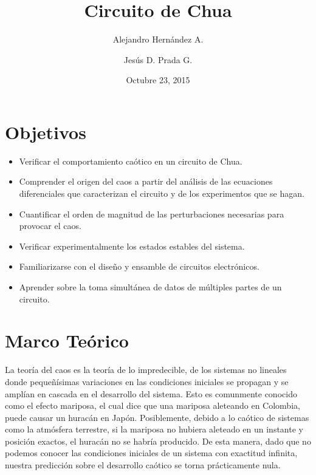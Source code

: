 \documentclass[%
 reprint,
%
 amsmath,amssymb,
 aps,
]{revtex4-1}
\begin{document}

\title{Circuito de Chua}%

\author{Alejandro Hernández A.}
 
\author{Jesús D. Prada G.}
 
%

\date{Octubre 23, 2015}%


\maketitle

\section{\label{sec:level1}Objetivos}
\begin{itemize}
\item Verificar el comportamiento caótico en un circuito de Chua.
\item Comprender el origen del caos a partir del análisis de las ecuaciones diferenciales que caracterizan el circuito y de los experimentos que se hagan.
\item Cuantificar el orden de magnitud de las perturbaciones necesarias para provocar el caos. 
\item Verificar experimentalmente los estados estables del sistema.
\item Familiarizarse con el diseño y ensamble de circuitos electrónicos.
\item Aprender sobre la toma simultánea de datos de múltiples partes de un circuito.

\end{itemize}

\section{\label{sec:level1}Marco Teórico}
La teoría del caos es la teoría de lo impredecible, de los sistemas no lineales donde pequeñísimas variaciones en las condiciones iniciales se propagan y se amplían en cascada en el desarrollo del sistema. Esto es comunmente conocido como el efecto mariposa, el cual dice que una mariposa aleteando en Colombia, puede causar un huracán en Japón. Posiblemente, debido a lo caótico de sistemas como la atmósfera terrestre, si la mariposa no hubiera aleteado en un instante y posición exactos, el huracán no se habría producido. De esta manera, dado que no podemos conocer las condiciones iniciales de un sistema con exactitud infinita, nuestra predicción sobre el desarrollo caótico se torna prácticamente nula.\\
\end{document}
